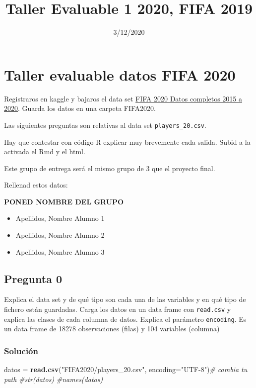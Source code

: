 \documentclass[
]{article}
\title{Taller Evaluable 1 2020, FIFA 2019}
\author{}
\date{\vspace{-2.5em}3/12/2020}
\newenvironment{Shaded}{\begin{snugshade}}{\end{snugshade}}
\newcommand{\CommentTok}[1]{\textcolor[rgb]{0.56,0.35,0.01}{\textit{#1}}}
\newcommand{\DataTypeTok}[1]{\textcolor[rgb]{0.13,0.29,0.53}{#1}}
\newcommand{\KeywordTok}[1]{\textcolor[rgb]{0.13,0.29,0.53}{\textbf{#1}}}
\newcommand{\NormalTok}[1]{#1}
\newcommand{\StringTok}[1]{\textcolor[rgb]{0.31,0.60,0.02}{#1}}
\providecommand{\tightlist}{%
  \setlength{\itemsep}{0pt}\setlength{\parskip}{0pt}}
\begin{document}
\maketitle

\hypertarget{taller-evaluable-datos-fifa-2020}{%
\section{Taller evaluable datos FIFA
2020}\label{taller-evaluable-datos-fifa-2020}}

Registraros en kaggle y bajaros el data set
\href{https://www.kaggle.com/stefanoleone992/fifa-20-complete-player-dataset}{FIFA
2020 Datos completos 2015 a 2020}. Guarda los datos en una carpeta
FIFA2020.

Las siguientes preguntas son relativas al data set
\texttt{players\_20.csv}.

Hay que contestar con código R explicar muy brevemente cada salida.
Subid a la activada el Rmd y el html.

Este grupo de entrega será el mismo grupo de 3 que el proyecto final.

Rellenad estos datos:

\textbf{PONED NOMBRE DEL GRUPO}

\begin{itemize}
\tightlist
\item
  Apellidos, Nombre Alumno 1
\item
  Apellidos, Nombre Alumno 2
\item
  Apellidos, Nombre Alumno 3
\end{itemize}

\hypertarget{pregunta-0}{%
\subsection{Pregunta 0}\label{pregunta-0}}

Explica el data set y de qué tipo son cada una de las variables y en qué
tipo de fichero están guardadas. Carga los datos en un data frame con
\texttt{read.csv} y explica las clases de cada columna de datos. Explica
el parámetro \texttt{encoding}. Es un data frame de 18278 observaciones
(filas) y 104 variables (columna)

\hypertarget{soluciuxf3n}{%
\subsubsection{Solución}\label{soluciuxf3n}}

\begin{Shaded}
\begin{Highlighting}[]
\NormalTok{datos =}\StringTok{ }\KeywordTok{read.csv}\NormalTok{(}\StringTok{"FIFA2020/players_20.csv"}\NormalTok{,}
  \DataTypeTok{encoding=}\StringTok{"UTF-8"}\NormalTok{)}\CommentTok{# cambia tu path}
\CommentTok{#str(datos)}
\CommentTok{#names(datos)}
\end{Highlighting}
\end{Shaded}
\end{document}
